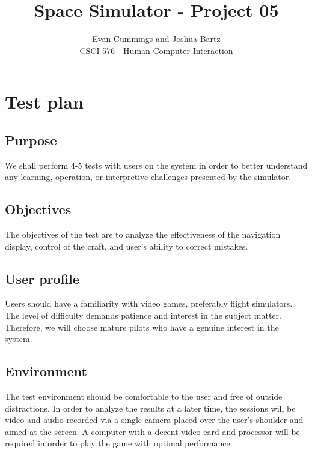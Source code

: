 
\DeclareMathOperator*{\argmax}{arg\,max}


\small

\title{Space Simulator - Project 05}
\author{Evan Cummings and Joshua Bartz\\
CSCI 576 - Human Computer Interaction}

\maketitle

\section{Test plan}

\subsection{Purpose}

We shall perform 4-5 tests with users on the system in order to better understand any learning, operation, or interpretive challenges presented by the simulator.

\subsection{Objectives}

The objectives of the test are to analyze the effectiveness of the navigation display, control of the craft, and user's ability to correct mistakes.

\subsection{User profile}

Users should have a familiarity with video games, preferably flight simulators.  The level of difficulty demands patience and interest in the subject matter.  Therefore, we will choose mature pilots who have a genuine interest in the system.

\subsection{Environment}

The test environment should be comfortable to the user and free of outside distractions.  In order to analyze the results at a later time, the sessions will be video and audio recorded via a single camera placed over the user's shoulder and aimed at the screen.  A computer with a decent video card and processor will be required in order to play the game with optimal performance.

